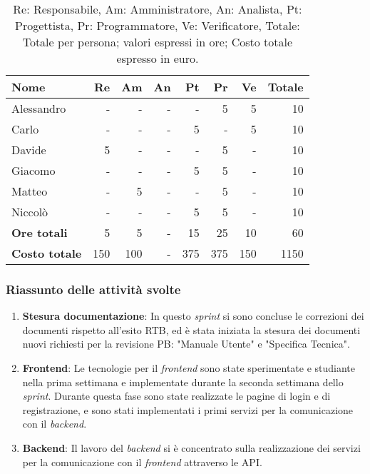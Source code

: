 \begin{table}[H]
	\centering
	\begin{tabular}{l|r|r|r|r|r|r|r}
		\textbf{Nome}         & \textbf{Re} & \textbf{Am} & \textbf{An} & \textbf{Pt} & \textbf{Pr} & \textbf{Ve} & \textbf{Totale} \\
		\hline
		Alessandro            & -           & -           & -           & -           & 5           & 5           & 10              \\
		Carlo                 & -           & -           & -           & 5           & -           & 5           & 10              \\
		Davide                & 5           & -           & -           & -           & 5           & -           & 10              \\
		Giacomo               & -           & -           & -           & 5           & 5           & -           & 10              \\
		Matteo                & -           & 5           & -           & -           & 5           & -           & 10              \\
		Niccolò               & -           & -           & -           & 5           & 5           & -           & 10              \\
		\hline
		\textbf{Ore totali}   & 5           & 5           & -           & 15          & 25          & 10          & 60              \\
		\textbf{Costo totale} & 150         & 100         & -           & 375         & 375         & 150         & 1150
	\end{tabular}
	\caption{Re: Responsabile, Am: Amministratore, An: Analista, Pt: Progettista,
		Pr: Programmatore, Ve: Verificatore, Totale: Totale per persona; valori espressi in ore; Costo totale espresso in euro.}
\end{table}

\subsubsection{Riassunto delle attività svolte}

\begin{enumerate}
	\item \textbf{Stesura documentazione}: In questo \textit{sprint} si sono concluse le correzioni dei documenti rispetto all'esito RTB,
	      ed è stata iniziata la stesura dei documenti nuovi richiesti per la revisione PB: "Manuale Utente" e "Specifica Tecnica".

	\item \textbf{Frontend}: Le tecnologie per il \textit{frontend} sono state sperimentate e studiante nella prima settimana e implementate durante la seconda settimana
	      dello \textit{sprint}. Durante questa fase sono state realizzate le pagine di login e di registrazione, e sono stati implementati i primi servizi per la comunicazione con il \textit{backend}.

	\item \textbf{Backend}: Il lavoro del \textit{backend} si è concentrato sulla realizzazione dei servizi per la comunicazione con il \textit{frontend} attraverso le API.
\end{enumerate}

